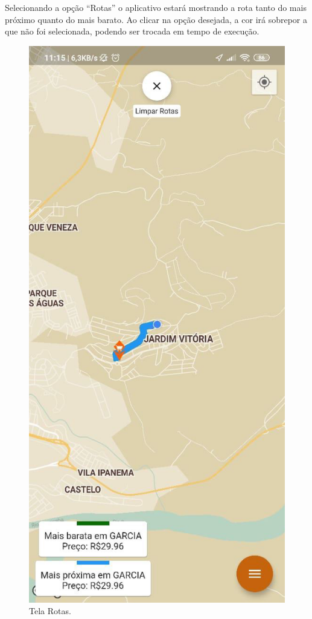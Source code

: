 Selecionando a opção “Rotas” o aplicativo estará mostrando a rota tanto do mais próximo quanto do mais barato. Ao clicar na opção desejada, a cor irá sobrepor a que não foi selecionada, podendo ser trocada em tempo de execução.
\begin{figure}[H]
    \centering
    \caption{Tela Rotas.}
    \includegraphics[scale=0.3]{Imagens/Print07.png}
\end{figure}
